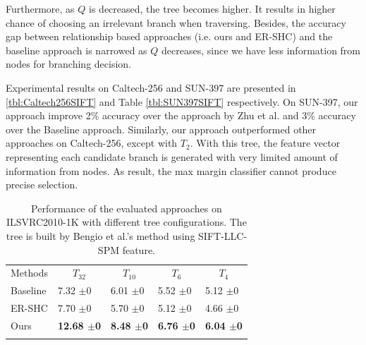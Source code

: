\documentclass[review]{elsarticle}
\begin{document}
Furthermore, as $Q$ is decreased, the tree becomes higher. It results in higher chance of choosing an irrelevant branch when traversing. Besides, the accuracy gap between relationship based approaches (i.e. ours and ER-SHC) and the baseline approach is narrowed as $Q$ decreases, since we have less information from nodes for branching decision.

Experimental results on Caltech-256 and SUN-397 are presented in \ref{tbl:Caltech256SIFT} and Table \ref{tbl:SUN397SIFT} respectively. On SUN-397, our approach improve 2\% accuracy over the approach by Zhu et al. \cite{Zhu.CVIU2014} and 3\% accuracy over the Baseline approach. Similarly, our approach outperformed other approaches on Caltech-256, except with $T_2$. With this tree, the feature vector representing each candidate branch is generated with very limited amount of information from nodes. As result, the max margin classifier cannot produce precise selection.


\begin{table}
\caption{Performance of the evaluated approaches on ILSVRC2010-1K with different tree configurations. The tree is built by Bengio et al.'s method \cite{Bengio.NIPS2010} using SIFT-LLC-SPM feature.}  
\label{tbl:ImageNet1KSIFT} 
\centering
\begin{tabular}{lllll}
\hline\noalign{\smallskip}
Methods  & \multicolumn{1}{c}{$T_{32}$} & \multicolumn{1}{c}{$T_{10}$} & \multicolumn{1}{c}{$T_{6}$} &		\multicolumn{1}{c}{$T_{4}$} \\
\noalign{\smallskip}\hline\hline\noalign{\smallskip}
Baseline 	 				& 7.32 $\pm$0	&	6.01 $\pm$0	&	5.52 $\pm$0	&	5.12 $\pm$0	\\
ER-SHC \cite{Zhu.CVIU2014} 	& 7.70 $\pm$0	&	5.70 $\pm$0	&	5.12 $\pm$0	&	4.66 $\pm$0	\\
Ours	     & \textbf{12.68 $\pm$0}&	\textbf{8.48 $\pm$0}&	\textbf{6.76 $\pm$0}&	\textbf{6.04 $\pm$0}\\
\noalign{\smallskip}\hline\noalign{\smallskip}
\end{tabular}
\end{table}

\end{document}

